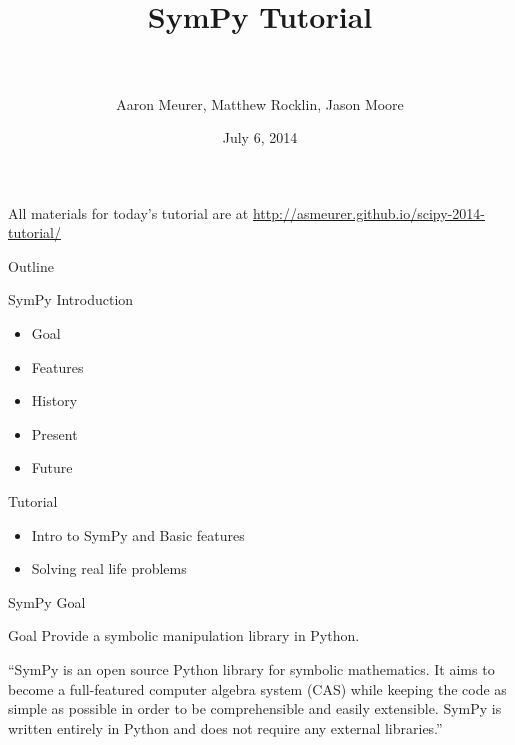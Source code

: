 \documentclass[xcolor=svgnames]{beamer}
\title[SymPy\hspace{4em}\insertframenumber/
\inserttotalframenumber]{~\\ SymPy Tutorial \\~}
\author[A. Meurer, Matthew Rocklin, Jason Moore]
{Aaron Meurer, Matthew Rocklin, Jason Moore}
\institute{\pgfuseimage{mylogo}}
\date{July 6, 2014}
\begin{document}
\begin{frame}
  \maketitle
\begin{center}
\normalsize All materials for today's tutorial are at \url{http://asmeurer.github.io/scipy-2014-tutorial/}
\end{center}
\end{frame}

\begin{frame}{Outline}
  \begin{block}{SymPy Introduction}
    \begin{itemize}
    \item Goal
    \item Features
    \item History
    \item Present
    \item Future
    \end{itemize}
  \end{block}

  \begin{block}{Tutorial}
    \begin{itemize}
    \item Intro to SymPy and Basic features
    \item Solving real life problems
    \end{itemize}
  \end{block}
\end{frame}

\begin{frame}{SymPy Goal}
  \begin{block}{Goal}
    Provide a symbolic manipulation library in Python.
  \end{block}
  \pause
  \begin{block}

    ``SymPy is an open source Python library for symbolic mathematics. It aims to
    become a full-featured computer algebra system (CAS) while keeping the code as
    simple as possible in order to be comprehensible and easily extensible. SymPy
    is written entirely in Python and does not require any external libraries.''

  \end{block}
\end{frame}
\end{document}
